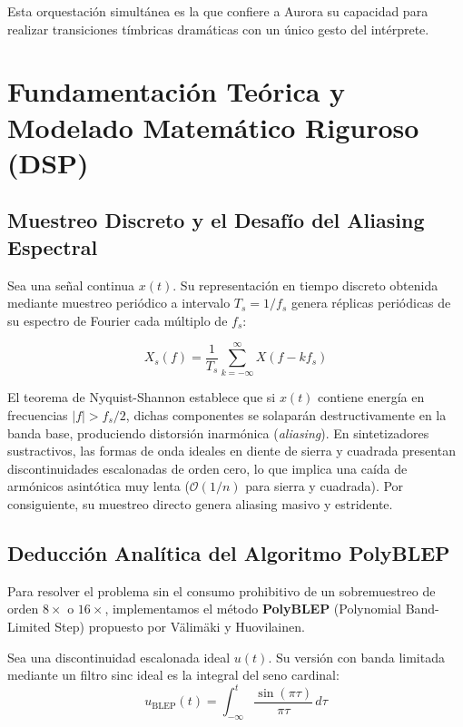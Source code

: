 \documentclass[11pt,a4paper]{article}
\begin{document}
Esta orquestación simultánea es la que confiere a Aurora su capacidad para realizar transiciones tímbricas dramáticas con un único gesto del intérprete.

\section{Fundamentación Teórica y Modelado Matemático Riguroso (DSP)}

\subsection{Muestreo Discreto y el Desafío del Aliasing Espectral}
Sea una señal continua $x(t)$. Su representación en tiempo discreto obtenida mediante muestreo periódico a intervalo $T_s = 1 / f_s$ genera réplicas periódicas de su espectro de Fourier cada múltiplo de $f_s$:

\begin{equation}
X_s(f) = \frac{1}{T_s} \sum_{k=-\infty}^{\infty} X\left(f - k f_s\right)
\end{equation}

El teorema de Nyquist-Shannon establece que si $x(t)$ contiene energía en frecuencias $|f| > f_s / 2$, dichas componentes se solaparán destructivamente en la banda base, produciendo distorsión inarmónica (\textit{aliasing}). En sintetizadores sustractivos, las formas de onda ideales en diente de sierra y cuadrada presentan discontinuidades escalonadas de orden cero, lo que implica una caída de armónicos asintótica muy lenta ($\mathcal{O}(1/n)$ para sierra y cuadrada). Por consiguiente, su muestreo directo genera aliasing masivo y estridente.

\subsection{Deducción Analítica del Algoritmo PolyBLEP}
Para resolver el problema sin el consumo prohibitivo de un sobremuestreo de orden $8\times$ o $16\times$, implementamos el método \textbf{PolyBLEP} (Polynomial Band-Limited Step) propuesto por Välimäki y Huovilainen. 

Sea una discontinuidad escalonada ideal $u(t)$. Su versión con banda limitada mediante un filtro sinc ideal es la integral del seno cardinal:
\begin{equation}
u_{\text{BLEP}}(t) = \int_{-\infty}^{t} \frac{\sin(\pi \tau)}{\pi \tau} \, d\tau
\end{equation}
\end{document}
